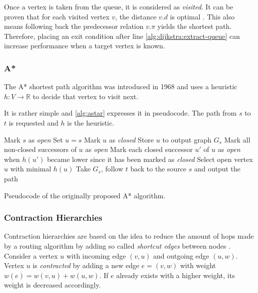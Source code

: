 			Once a vertex is taken from the queue, it is considered as \emph{visited}.
			It can be proven that for each visited vertex $v$, the distance $v.d$ is optimal \cite[659-661]{cormen-introduction-to-alg}.
			This also means following back the predecessor relation $v.\pi$ yields the shortest path.
			Therefore, placing an exit condition after line \ref{alg:dijkstra:extract-queue} can increase performance when a target vertex is known.
		
		\subsubsection{A*}
		\label{subsubsec:astar}
		
			The A* shortest path algorithm was introduced in 1968 and uses a heuristic $h : V \rightarrow \mathbb{R}$ to decide that vertex to visit next.
			
			It is rather simple and \cref{alg:astar} expresses it in pseudocode.
			The path from $s$ to $t$ is requested and $h$ is the heuristic.
			
			\begin{algorithm}[h]
				\begin{algorithmic}[1]
					\State Mark $s$ as \emph{open}
					\State Set $u = s$
						\State Mark $u$ as \emph{closed}
						\State Store $u$ to output graph $G_s$
						\State Mark all non-closed successors of $u$ as \emph{open}
						\State Mark each closed successor $u'$ of $u$ as \emph{open} when $h(u')$ became lower since it has been marked as \emph{closed}
						\State Select open vertex $u$ with minimal $h(u)$
					\EndWhile
					\State Take $G_s$, follow $t$ back to the source $s$ and output the path
				\end{algorithmic}
				\caption{Pseudocode of the originally proposed A* algorithm.}
				\label{alg:astar}
			\end{algorithm}
		
		\subsubsection{Contraction Hierarchies}
		\label{subsubsec:ch}
		
			Contraction hierarchies are based on the idea to reduce the amount of hops made by a routing algorithm by adding so called \emph{shortcut edges} between nodes \cite{geisberger-contraction-hierarchies}.
			Consider a vertex $u$ with incoming edge $(v, u)$ and outgoing edge $(u, w)$.
			Vertex $u$ is \emph{contracted} by adding a new edge $e = (v, w)$ with weight $w(e) = w(v, u) + w(u, w)$.
			If $e$ already exists with a higher weight, its weight is decreased accordingly.
			
